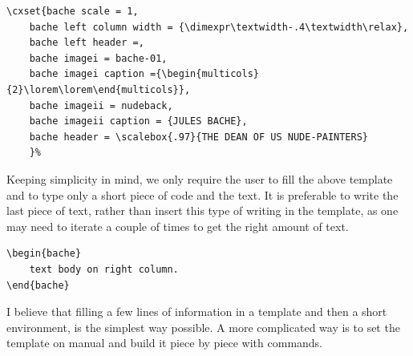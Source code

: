 \begin{lstlisting}
\cxset{bache scale = 1,
    bache left column width = {\dimexpr\textwidth-.4\textwidth\relax},
    bache left header =,
    bache imagei = bache-01,
    bache imagei caption ={\begin{multicols}{2}\lorem\lorem\end{multicols}},
    bache imageii = nudeback,
    bache imageii caption = {JULES BACHE},
    bache header = \scalebox{.97}{THE DEAN OF US NUDE-PAINTERS}
    }%
\end{lstlisting}

Keeping simplicity in mind, we only require the user to fill the above template and to type only
a short piece of code and the text. It is preferable to write the last piece of
text, rather than insert this type of writing in the template, as one may need to iterate a 
couple of times to get the right amount of text.
\begin{lstlisting}
\begin{bache}
    text body on right column.
\end{bache}
\end{lstlisting}

I believe that filling a few lines of information in a template and then a short environment, is
the simplest way possible. A more complicated way is to set the template on manual and
build it piece by piece with commands.





\restoregeometry